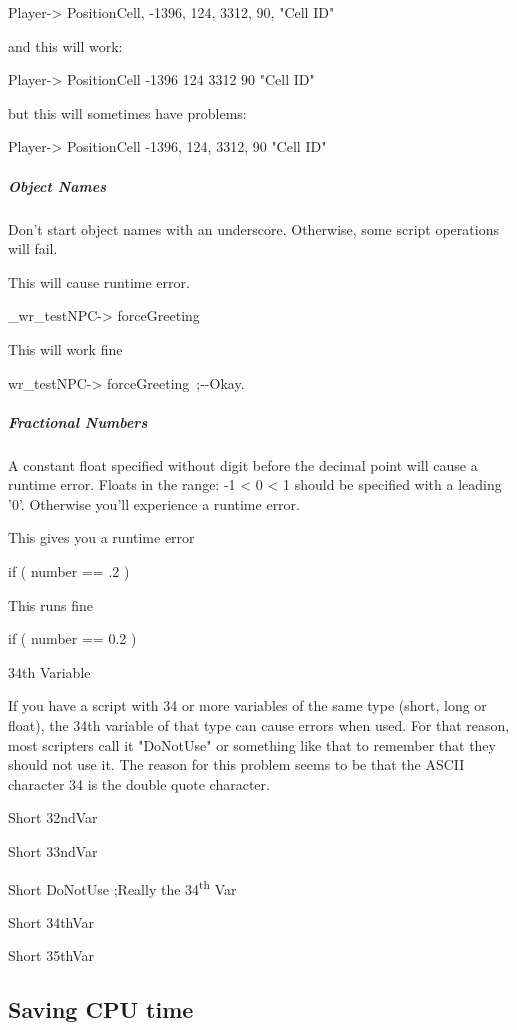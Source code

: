 Player-> PositionCell, -1396, 124, 3312, 90, "Cell ID"

and this will work:

Player-> PositionCell -1396 124 3312 90 "Cell ID"

but this will sometimes have problems:

Player-> PositionCell -1396, 124, 3312, 90 "Cell ID"

\hypertarget{object-names}{%
\subparagraph{Object Names}\label{object-names}}

Don't start object names with an underscore. Otherwise, some script
operations will fail.

This will cause runtime error.

\_wr\_testNPC-> forceGreeting

This will work fine

wr\_testNPC-> forceGreeting~;-\/-Okay.

\hypertarget{fractional-numbers}{%
\subparagraph{Fractional Numbers}\label{fractional-numbers}}

A constant float specified without digit before the decimal point will
cause a runtime error. Floats in the range: -1 < 0 <
1 should be specified with a leading '0'. Otherwise you'll experience a
runtime error.

This gives you a runtime error

if ( number == .2 )~

This runs fine

if ( number == 0.2 )

34th Variable

If you have a script with 34 or more variables of the same type (short,
long or float), the 34th variable of that type can cause errors when
used. For that reason, most scripters call it "DoNotUse" or something
like that to remember that they should not use it. The reason for this
problem seems to be that the ASCII character 34 is the double quote
character.

Short 32ndVar

Short 33ndVar

Short DoNotUse ;Really the 34\textsuperscript{th} Var

Short 34thVar

Short 35thVar

\hypertarget{saving-cpu-time}{%
\subsection{\texorpdfstring{\hfill\break
Saving CPU time}{ Saving CPU time}}\label{saving-cpu-time}}


